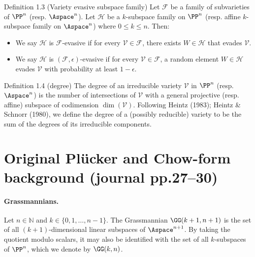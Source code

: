 \begin{result}{Definition 1.3 (Variety evasive subspace family)}
Let $\mathcal F$ be a family of subvarieties of $\PP^n$ (resp. $\Aspace^n$). Let $\mathcal H$ be a $k$-subspace family on $\PP^n$ (resp. affine $k$-subspace family on $\Aspace^n$) where $0\le k\le n$. Then:
\begin{itemize}\item We say $\mathcal H$ is $\mathcal F$-evasive if for every $\mathcal V\in\mathcal F$, there exists $W\in\mathcal H$ that evades $\mathcal V$.
\item We say $\mathcal H$ is $(\mathcal F,\epsilon)$-evasive if for every $\mathcal V\in\mathcal F$, a random element $W\in\mathcal H$ evades $\mathcal V$ with probability at least $1-\epsilon$.\end{itemize}
\end{result}
\begin{result}{Definition 1.4 (degree)}
The degree of an irreducible variety $\mathcal V$ in $\PP^n$ (resp. $\Aspace^n$) is the number of intersections of $\mathcal V$ with a general projective (resp. affine) subspace of codimension $\dim(\mathcal V)$. Following Heintz (1983); Heintz \& Schnorr (1980), we define the degree of a (possibly reducible) variety to be the sum of the degrees of its irreducible components.
\end{result}
\section*{Original Pl\"ucker and Chow-form background (journal pp.27--30)}
\paragraph{Grassmannians.}
Let $n\in\mathbb N$ and $k\in\{0,1,\ldots,n-1\}$. The Grassmannian $\GG(k+1,n+1)$ is the set of all $(k+1)$-dimensional linear subspaces of $\Aspace^{n+1}$. By taking the quotient modulo scalars, it may also be identified with the set of all $k$-subspaces of $\PP^n$, which we denote by $\GG(k,n)$.
